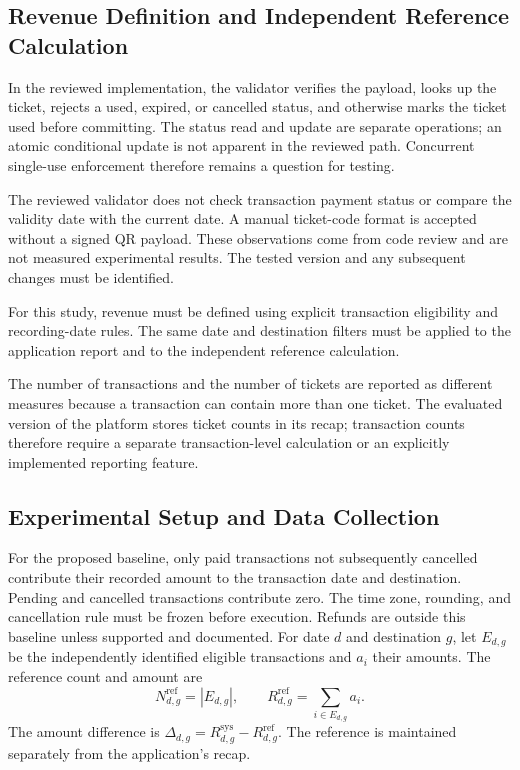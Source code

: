 \documentclass[runningheads]{llncs}
\begin{document}
\subsection{Revenue Definition and Independent Reference Calculation}

In the reviewed implementation, the validator verifies the payload,
looks up the ticket, rejects a used, expired, or cancelled status,
and otherwise marks the ticket used before committing. The status read
and update are separate operations; an atomic conditional update is
not apparent in the reviewed path. Concurrent single-use enforcement
therefore remains a question for testing.

The reviewed validator does not check transaction payment status or
compare the validity date with the current date. A manual ticket-code
format is accepted without a signed QR payload. These observations
come from code review and are not measured experimental results. The
tested version and any subsequent changes must be identified.

For this study, revenue must be defined using explicit transaction
eligibility and recording-date rules. The same date and destination
filters must be applied to the application report and to the
independent reference calculation.

%

The number of transactions and the number of tickets are reported as
different measures because a transaction can contain more than one
ticket. The evaluated version of the platform stores ticket counts in
its recap; transaction counts therefore require a separate
transaction-level calculation or an explicitly implemented reporting
feature.

\subsection{Experimental Setup and Data Collection}

For the proposed baseline, only paid transactions not subsequently
cancelled contribute their recorded amount to the transaction date
and destination. Pending and cancelled transactions contribute zero.
The time zone, rounding, and cancellation rule must be frozen before
execution. Refunds are outside this baseline unless supported and
documented. For date $d$ and destination $g$, let $E_{d,g}$ be the
independently identified eligible transactions and $a_i$ their amounts.
The reference count and amount are
\begin{equation}
N^{\mathrm{ref}}_{d,g}=|E_{d,g}|,\qquad
R^{\mathrm{ref}}_{d,g}=\sum_{i\in E_{d,g}} a_i.
\end{equation}
The amount difference is
$\Delta_{d,g}=R^{\mathrm{sys}}_{d,g}-R^{\mathrm{ref}}_{d,g}$.
The reference is maintained separately from the application's recap.
\end{document}

